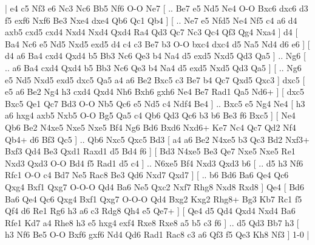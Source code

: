 \makegametitle 
|   e4   c5    Nf3   e6    Nc3   Nc6    Bb5   Nf6    O-O   Ne7 [ .. Be7  e5 Nd5  Ne4 O-O  Bxc6 dxc6  d3 f5  exf6 Nxf6  Be3 Nxe4  dxe4 Qb6  Qc1 Qb4   ]  [ .. Ne7  e5 Nfd5  Ne4 Nf5  c4 a6  d4 axb5  cxd5 cxd4  Nxd4 Nxd4  Qxd4 Ra4  Qd3 Qc7  Nc3 Qc4  Qf3 Qg4  Nxa4   ]  d4 [  Ba4 Nc6  e5 Nd5  Nxd5 exd5  d4 c4  c3 Be7  b3 O-O  bxc4 dxc4  d5 Na5  Nd4 d6  e6   ]  [  d4 a6  Ba4 cxd4  Qxd4 b5  Bb3 Nc6  Qe3 b4  Na4 d5  exd5 Nxd5  Qd3 Qa5   ] .. Ng6 [ .. a6  Ba4 cxd4  Qxd4 b5  Bb3 Nc6  Qe3 b4  Na4 d5  exd5 Nxd5  Qd3 Qa5   ]  [ .. Ng6  e5 Nd5  Nxd5 exd5  dxc5 Qa5  a4 a6  Be2 Bxc5  c3 Be7  b4 Qc7  Qxd5 Qxc3   ]  dxc5 [  e5 a6  Be2 Ng4  h3 cxd4  Qxd4 Nh6  Bxh6 gxh6  Ne4 Be7  Rad1 Qa5  Nd6+   ]  [  dxc5 Bxc5  Qe1 Qc7  Bd3 O-O  Nb5 Qc6  e5 Nd5  c4 Ndf4  Be4   ] .. Bxc5    e5   Ng4    Ne4 [  h3 a6  hxg4 axb5  Nxb5 O-O  Bg5 Qa5  c4 Qb6  Qd3 Qc6  b3 b6  Be3 f6  Bxc5   ]  [  Ne4 Qb6  Be2 N4xe5  Nxe5 Nxe5  Bf4 Ng6  Bd6 Bxd6  Nxd6+ Ke7  Nc4 Qc7  Qd2 Nf4  Qb4+ d6  Bf3 Qc5   ] .. Qb6    Nxc5   Qxc5    Bd3 [  a4 a6  Be2 N4xe5  b3 Qc3  Bd2 Nxf3+  Bxf3 Qd4  Be3 Qxd1  Raxd1 d5  Bd4 f6   ]  [  Bd3 N4xe5  Be3 Qe7  Nxe5 Nxe5  Re1 Nxd3  Qxd3 O-O  Bd4 f5  Rad1 d5  c4   ] .. N6xe5    Bf4   Nxd3    Qxd3   b6 [ .. d5  h3 Nf6  Rfc1 O-O  c4 Bd7  Ne5 Rac8  Be3 Qd6  Nxd7 Qxd7   ]  [ .. b6  Bd6 Ba6  Qe4 Qc6  Qxg4 Bxf1  Qxg7 O-O-O  Qd4 Ba6  Ne5 Qxc2  Nxf7 Rhg8  Nxd8 Rxd8   ]  Qe4 [  Bd6 Ba6  Qe4 Qc6  Qxg4 Bxf1  Qxg7 O-O-O  Qd4 Bxg2  Kxg2 Rhg8+  Bg3 Kb7  Rc1 f5  Qf4 d6  Re1 Rg6  h3 a6  c3 Rdg8  Qh4 e5  Qe7+   ]  [  Qe4 d5  Qd4 Qxd4  Nxd4 Ba6  Rfe1 Kd7  a4 Rhe8  h3 e5  hxg4 exf4  Rxe8 Rxe8  a5 b5  c3 f6   ] .. d5    Qd3   Bb7    h3    [  h3 Nf6  Be5 O-O  Bxf6 gxf6  Nd4 Qd6  Rad1 Rac8  c3 a6  Qf3 f5  Qe3 Kh8  Nf3   ] 1-0  |
